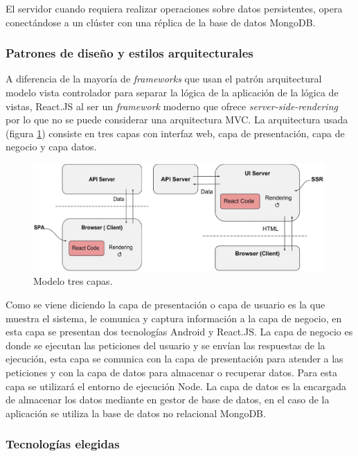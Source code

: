 \documentclass{article}
\begin{document}
El servidor cuando requiera realizar operaciones sobre datos persistentes, opera conectándose a un clúster con una réplica de la base de datos MongoDB.

\pagebreak

\subsubsection*{Patrones de diseño y estilos arquitecturales}

A diferencia de la mayoría de \textit{frameworks} que usan el patrón arquitectural modelo vista controlador para separar la lógica de la aplicación de la lógica de vistas, React.JS al ser un \textit{framework} moderno que ofrece \textit{server-side-rendering} por lo que no se puede considerar una arquitectura MVC.
La arquitectura usada (figura \ref{patron}) consiste en tres capas con interfaz web, capa de presentación, capa de negocio y capa datos.

\begin{figure}[H]
   \centering
       \includegraphics[width=0.99\textwidth]{../images/patron.jpg}
   \caption{Modelo tres capas.}
   \label{patron}
\end{figure}

Como se viene diciendo la capa de presentación o capa de usuario es la que muestra el sistema, le comunica y captura información a la capa de negocio, en esta capa se presentan dos tecnologías Android y React.JS.
La capa de negocio es donde se ejecutan las peticiones del usuario y se envían las respuestas de la ejecución, esta capa se comunica con la capa de presentación para atender a las peticiones y con la capa de datos para almacenar o recuperar datos. Para esta capa se utilizará el entorno de ejecución Node.
La capa de datos es la encargada de almacenar los datos mediante en gestor de base de datos, en el caso de la aplicación se utiliza la base de datos no relacional MongoDB.


\subsubsection*{Tecnologías elegidas}
\end{document}
